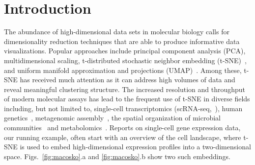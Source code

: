 \documentclass[letter]{article}
\begin{document}
\section*{Introduction}

The abundance of high-dimensional data sets in molecular biology calls for
dimensionality reduction techniques that are able to produce
informative data visualizations. Popular approaches include principal component
analysis (PCA), multidimensional scaling, t-distributed stochastic neighbor
embedding (t-SNE)~\cite{maaten2008visualizing}, and uniform manifold
approximation and projections (UMAP)~\cite{2018arXivUMAP}. Among these, t-SNE has
received much attention as it can address high volumes of data and reveal
meaningful clustering structure. The increased resolution and throughput of modern
molecular assays has lead to the frequent use of t-SNE in diverse fields
including, but not limited to, single-cell
transcriptomics (scRNA-seq,~\cite{macosko2015highly,cao2019single,tasic2018shared}),
human genetics~\cite{hirata2019genetic}, metagenomic
assembly~\cite{beaulaurier2018metagenomic}, the spatial organization of
microbial communities~\cite{sheth2019spatial} and
metabolomics~\cite{tkachev2019differences}. Reports on single-cell gene
expression data, our running example, often start with an overview of the cell
landscape, where t-SNE is used to embed high-dimensional expression profiles into a
two-dimensional space. Figs.~\ref{fig:macosko}.a and \ref{fig:macosko}.b show
two such embeddings.
\end{document}
